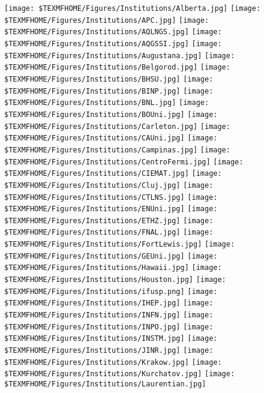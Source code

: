 %
\begin{center}
\texttt{[image: \$TEXMFHOME/Figures/Institutions/Alberta.jpg]}
\texttt{[image: \$TEXMFHOME/Figures/Institutions/APC.jpg]}
\texttt{[image: \$TEXMFHOME/Figures/Institutions/AQLNGS.jpg]}
\texttt{[image: \$TEXMFHOME/Figures/Institutions/AQGSSI.jpg]}
\texttt{[image: \$TEXMFHOME/Figures/Institutions/Augustana.jpg]}
\texttt{[image: \$TEXMFHOME/Figures/Institutions/Belgorod.jpg]}
\texttt{[image: \$TEXMFHOME/Figures/Institutions/BHSU.jpg]}
\texttt{[image: \$TEXMFHOME/Figures/Institutions/BINP.jpg]}
\texttt{[image: \$TEXMFHOME/Figures/Institutions/BNL.jpg]}
\texttt{[image: \$TEXMFHOME/Figures/Institutions/BOUni.jpg]}
\texttt{[image: \$TEXMFHOME/Figures/Institutions/Carleton.jpg]}
\texttt{[image: \$TEXMFHOME/Figures/Institutions/CAUni.jpg]}
\texttt{[image: \$TEXMFHOME/Figures/Institutions/Campinas.jpg]}
\texttt{[image: \$TEXMFHOME/Figures/Institutions/CentroFermi.jpg]}
\texttt{[image: \$TEXMFHOME/Figures/Institutions/CIEMAT.jpg]}
\texttt{[image: \$TEXMFHOME/Figures/Institutions/Cluj.jpg]}
\texttt{[image: \$TEXMFHOME/Figures/Institutions/CTLNS.jpg]}
\texttt{[image: \$TEXMFHOME/Figures/Institutions/ENUni.jpg]}
\texttt{[image: \$TEXMFHOME/Figures/Institutions/ETHZ.jpg]}
\texttt{[image: \$TEXMFHOME/Figures/Institutions/FNAL.jpg]}
\texttt{[image: \$TEXMFHOME/Figures/Institutions/FortLewis.jpg]}
\texttt{[image: \$TEXMFHOME/Figures/Institutions/GEUni.jpg]}
\texttt{[image: \$TEXMFHOME/Figures/Institutions/Hawaii.jpg]}
\texttt{[image: \$TEXMFHOME/Figures/Institutions/Houston.jpg]}
\texttt{[image: \$TEXMFHOME/Figures/Institutions/ifusp.png]}
\texttt{[image: \$TEXMFHOME/Figures/Institutions/IHEP.jpg]}
\texttt{[image: \$TEXMFHOME/Figures/Institutions/INFN.jpg]}
\texttt{[image: \$TEXMFHOME/Figures/Institutions/INPO.jpg]}
\texttt{[image: \$TEXMFHOME/Figures/Institutions/INSTM.jpg]}
\texttt{[image: \$TEXMFHOME/Figures/Institutions/JINR.jpg]}
\texttt{[image: \$TEXMFHOME/Figures/Institutions/Krakow.jpg]}
\texttt{[image: \$TEXMFHOME/Figures/Institutions/Kurchatov.jpg]}
\texttt{[image: \$TEXMFHOME/Figures/Institutions/Laurentian.jpg]}

\end{center}
